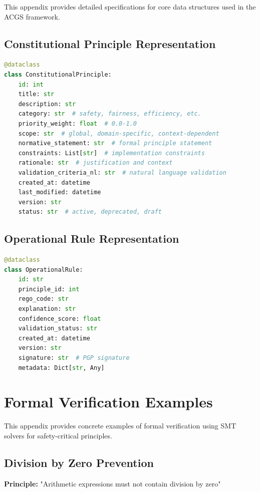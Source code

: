 \documentclass[sigconf,natbib]{acmart}
\begin{document}
This appendix provides detailed specifications for core data structures used in the ACGS framework.

\subsection{Constitutional Principle Representation}
\begin{lstlisting}[language=Python, caption=ConstitutionalPrinciple Data Structure]
@dataclass
class ConstitutionalPrinciple:
    id: int
    title: str
    description: str
    category: str  # safety, fairness, efficiency, etc.
    priority_weight: float  # 0.0-1.0
    scope: str  # global, domain-specific, context-dependent
    normative_statement: str  # formal principle statement
    constraints: List[str]  # implementation constraints
    rationale: str  # justification and context
    validation_criteria_nl: str  # natural language validation
    created_at: datetime
    last_modified: datetime
    version: str
    status: str  # active, deprecated, draft
\end{lstlisting}

\subsection{Operational Rule Representation}
\begin{lstlisting}[language=Python, caption=OperationalRule Data Structure]
@dataclass
class OperationalRule:
    id: str
    principle_id: int
    rego_code: str
    explanation: str
    confidence_score: float
    validation_status: str
    created_at: datetime
    version: str
    signature: str  # PGP signature
    metadata: Dict[str, Any]
\end{lstlisting}

\section{Formal Verification Examples}
\label{app:formal_verification}

This appendix provides concrete examples of formal verification using SMT solvers for safety-critical principles.

\subsection{Division by Zero Prevention}
\textbf{Principle:} "Arithmetic expressions must not contain division by zero"
\end{document}
